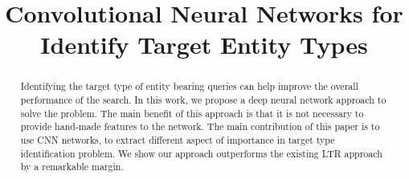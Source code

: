 \documentclass[sigconf]{acmart}
\begin{document}
\title{Convolutional Neural Networks for Identify Target Entity Types}


%
%
%
%
%


\begin{abstract}
Identifying the target type of entity bearing queries can help improve the overall performance of the search. In this work, we propose a deep neural network approach to solve the problem. The main benefit of this approach is that it is not necessary to provide hand-made features to the network. The main contribution of this paper is to use CNN networks, to extract different aspect of importance in target type identification problem. We show our approach outperforms the existing LTR approach by a remarkable margin.
\end{abstract}

%
%





\maketitle







\end{document}
